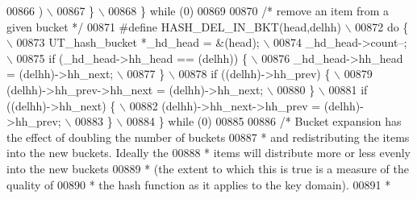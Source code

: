 \begin{DoxyCode}
{{{{{{{{00866 \textcolor{preprocessor}{    )                                                                            \(\backslash\)}
00867 \textcolor{preprocessor}{  \}                                                                              \(\backslash\)}
00868 \textcolor{preprocessor}{\} while (0)}
00869 
00870 \textcolor{comment}{/* remove an item from a given bucket */}
00871 \textcolor{preprocessor}{#define HASH\_DEL\_IN\_BKT(head,delhh)                                              \(\backslash\)}
00872 \textcolor{preprocessor}{do \{                                                                             \(\backslash\)}
00873 \textcolor{preprocessor}{  UT\_hash\_bucket *\_hd\_head = &(head);                                            \(\backslash\)}
00874 \textcolor{preprocessor}{  \_hd\_head->count--;                                                             \(\backslash\)}
00875 \textcolor{preprocessor}{  if (\_hd\_head->hh\_head == (delhh)) \{                                            \(\backslash\)}
00876 \textcolor{preprocessor}{    \_hd\_head->hh\_head = (delhh)->hh\_next;                                        \(\backslash\)}
00877 \textcolor{preprocessor}{  \}                                                                              \(\backslash\)}
00878 \textcolor{preprocessor}{  if ((delhh)->hh\_prev) \{                                                        \(\backslash\)}
00879 \textcolor{preprocessor}{    (delhh)->hh\_prev->hh\_next = (delhh)->hh\_next;                                \(\backslash\)}
00880 \textcolor{preprocessor}{  \}                                                                              \(\backslash\)}
00881 \textcolor{preprocessor}{  if ((delhh)->hh\_next) \{                                                        \(\backslash\)}
00882 \textcolor{preprocessor}{    (delhh)->hh\_next->hh\_prev = (delhh)->hh\_prev;                                \(\backslash\)}
00883 \textcolor{preprocessor}{  \}                                                                              \(\backslash\)}
00884 \textcolor{preprocessor}{\} while (0)}
00885 
00886 \textcolor{comment}{/* Bucket expansion has the effect of doubling the number of buckets}
00887 \textcolor{comment}{ * and redistributing the items into the new buckets. Ideally the}
00888 \textcolor{comment}{ * items will distribute more or less evenly into the new buckets}
00889 \textcolor{comment}{ * (the extent to which this is true is a measure of the quality of}
00890 \textcolor{comment}{ * the hash function as it applies to the key domain).}
00891 \textcolor{comment}{ *}
}}}}}}}}
\end{DoxyCode}
